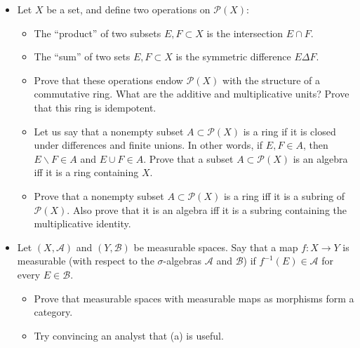 \begin{itemize}
\item
  Let \(X\) be a set, and define two operations on \(\mathcal{P}(X)\):

  \begin{itemize}
  \item
    The ``product'' of two subsets \(E,F \subset X\) is the intersection \(E \cap F\).
  \item
    The ``sum'' of two sets \(E,F \subset X\) is the symmetric difference \(E\Delta F\).
  \item
    Prove that these operations endow \(\mathcal{P}(X)\) with the structure of a commutative ring. What are the additive and multiplicative units? Prove that this ring is idempotent.
  \item
    Let us say that a nonempty subset \(A \subset \mathcal{P}(X)\) is a ring if it is closed under differences and finite unions. In other words, if \(E,F \in A\), then \(E\backslash F \in A\) and \(E \cup F \in A\). Prove that a subset \(A \subset \mathcal{P}(X)\) is an algebra iff it is a ring containing \(X\).
  \item
    Prove that a nonempty subset \(A \subset \mathcal{P}(X)\) is a ring iff it is a subring of \(\mathcal{P}(X)\). Also prove that it is an algebra iff it is a subring containing the multiplicative identity.
  \end{itemize}
\item
  Let \((X,\mathcal{A})\) and \((Y,\mathcal{B})\) be measurable spaces. Say that a map \(f:X\rightarrow Y\) is measurable (with respect to the \(\sigma\)-algebras \(\mathcal{A}\) and \(\mathcal{B}\)) if \(f^{- 1}(E) \in \mathcal{A}\) for every \(E \in \mathcal{B}\).

  \begin{itemize}
  \item
    Prove that measurable spaces with measurable maps as morphisms form a category.
  \item
    Try convincing an analyst that (a) is useful.
  \end{itemize}
\end{itemize}
